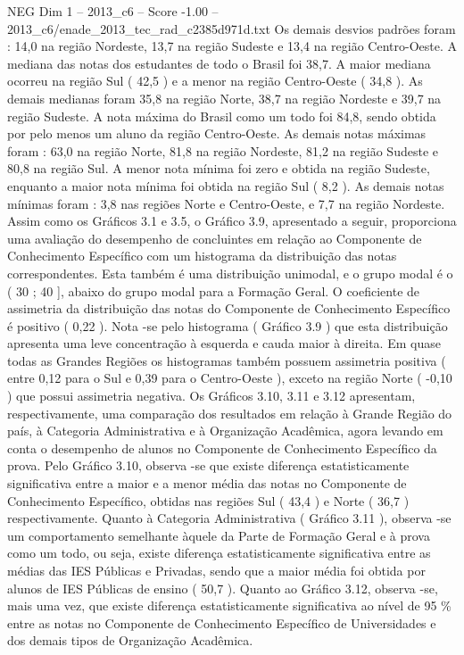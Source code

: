 \begin{textsample}{NEG Dim 1 – 2013\_c6 – Score -1.00 – 2013\_c6/enade\_2013\_tec\_rad\_c2385d971d.txt}
Os demais desvios padrões foram : 14,0 na região Nordeste, 13,7 na região Sudeste e 13,4 na região Centro-Oeste.
A mediana das notas dos estudantes de todo o Brasil foi 38,7.
A maior mediana ocorreu na região Sul ( 42,5 ) e a menor na região Centro-Oeste ( 34,8 ).
As demais medianas foram 35,8 na região Norte, 38,7 na região Nordeste e 39,7 na região Sudeste.
A nota máxima do Brasil como um todo foi 84,8, sendo obtida por pelo menos um aluno da região Centro-Oeste.
As demais notas máximas foram : 63,0 na região Norte, 81,8 na região Nordeste, 81,2 na região Sudeste e 80,8 na região Sul.
A menor nota mínima foi zero e obtida na região Sudeste, enquanto a maior nota mínima foi obtida na região Sul ( 8,2 ).
As demais notas mínimas foram : 3,8 nas regiões Norte e Centro-Oeste, e 7,7 na região Nordeste.
Assim como os Gráficos 3.1 e 3.5, o Gráfico 3.9, apresentado a seguir, proporciona uma avaliação do desempenho de concluintes em relação ao Componente de Conhecimento Específico com um histograma da distribuição das notas correspondentes.
Esta também é uma distribuição unimodal, e o grupo modal é o ( 30 ; 40 ], abaixo do grupo modal para a Formação Geral.
O coeficiente de assimetria da distribuição das notas do Componente de Conhecimento Específico é positivo ( 0,22 ).
Nota -se pelo histograma ( Gráfico 3.9 ) que esta distribuição apresenta uma leve concentração à esquerda e cauda maior à direita.
Em quase todas as Grandes Regiões os histogramas também possuem assimetria positiva ( entre 0,12 para o Sul e 0,39 para o Centro-Oeste ), exceto na região Norte ( -0,10 ) que possui assimetria negativa.
Os Gráficos 3.10, 3.11 e 3.12 apresentam, respectivamente, uma comparação dos resultados em relação à Grande Região do país, à Categoria Administrativa e à Organização Acadêmica, agora levando em conta o desempenho de alunos no Componente de Conhecimento Específico da prova.
Pelo Gráfico 3.10, observa -se que existe diferença estatisticamente significativa entre a maior e a menor média das notas no Componente de Conhecimento Específico, obtidas nas regiões Sul ( 43,4 ) e Norte ( 36,7 ) respectivamente.
Quanto à Categoria Administrativa ( Gráfico 3.11 ), observa -se um comportamento semelhante àquele da Parte de Formação Geral e à prova como um todo, ou seja, existe diferença estatisticamente significativa entre as médias das IES Públicas e Privadas, sendo que a maior média foi obtida por alunos de IES Públicas de ensino ( 50,7 ).
Quanto ao Gráfico 3.12, observa -se, mais uma vez, que existe diferença estatisticamente significativa ao nível de 95 \% entre as notas no Componente de Conhecimento Específico de Universidades e dos demais tipos de Organização Acadêmica.

\end{textsample}
